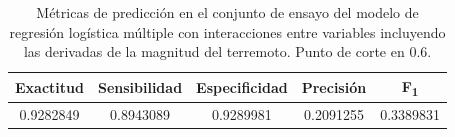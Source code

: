 \documentclass[a4paper]{report}
\begin{document}
\begin{table}[!ht]
	\centering
	\begin{tabular}{ccccc}
		\toprule
		Exactitud & Sensibilidad & Especificidad & Precisión & F\textsubscript{1} \\
		\midrule
		\num{0.9282849} & \num{0.8943089} & \num{0.9289981} & \num{0.2091255} & \num{0.3389831}\\
		\bottomrule
	\end{tabular}
	\caption{Métricas de predicción en el conjunto de ensayo del modelo de regresión logística múltiple con interacciones entre variables incluyendo las derivadas de la magnitud del terremoto. Punto de corte en \num{0.6}.
	}
	\label{tab:múltiple_metrics_derivadas}
\end{table}
\end{document}
